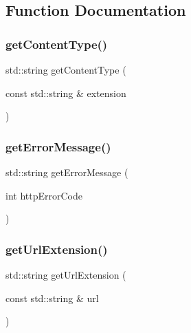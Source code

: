 \subsection{Function Documentation}
\mbox{\label{namespaceHttpServer_ac6f7f384cb8cf20d5d04518a080c45a0}} 
\subsubsection{\texorpdfstring{get\+Content\+Type()}{getContentType()}}
{\footnotesize\ttfamily std\+::string get\+Content\+Type (\begin{DoxyParamCaption}\item[{const std\+::string \&}]{extension }\end{DoxyParamCaption})}

\mbox{\label{namespaceHttpServer_a185aa863644e8757a66967ff36b6935c}} 
\subsubsection{\texorpdfstring{get\+Error\+Message()}{getErrorMessage()}}
{\footnotesize\ttfamily std\+::string get\+Error\+Message (\begin{DoxyParamCaption}\item[{int}]{http\+Error\+Code }\end{DoxyParamCaption})}

\mbox{\label{namespaceHttpServer_abf169666c2d4abcd31ea765851c24da5}} 
\subsubsection{\texorpdfstring{get\+Url\+Extension()}{getUrlExtension()}}
{\footnotesize\ttfamily std\+::string get\+Url\+Extension (\begin{DoxyParamCaption}\item[{const std\+::string \&}]{url }\end{DoxyParamCaption})}

